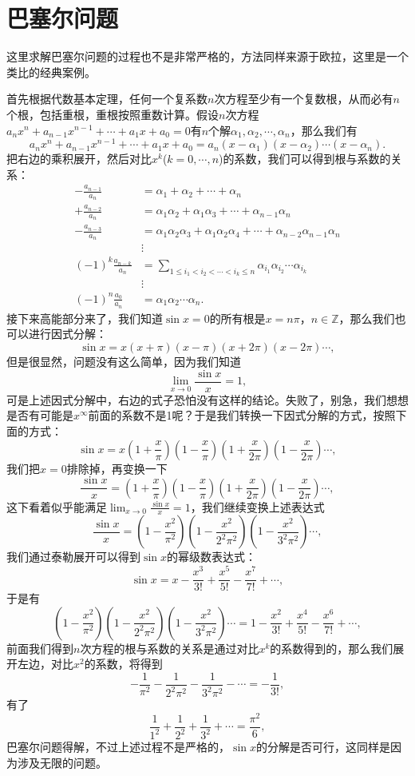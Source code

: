 \documentclass[cn]{elegantbook}
\begin{document}
\section{巴塞尔问题}
这里求解巴塞尔问题的过程也不是非常严格的，方法同样来源于欧拉，这里是一个类比的经典案例。

首先根据代数基本定理，任何一个复系数$n$次方程至少有一个复数根，从而必有$n$个根，包括重根，重根按照重数计算。假设$n$次方程$a_nx^n+a_{n-1}x^{n-1} + \cdots + a_1x+a_0=0$有$n$个解$\alpha_1, \alpha_2,\cdots,\alpha_n$，那么我们有
\[
a_nx^n+a_{n-1}x^{n-1} + \cdots + a_1x+a_0=a_n(x-\alpha_1)(x-\alpha_2)\cdots(x-\alpha_n).
\]
把右边的乘积展开，然后对比$x^k$($k=0,\cdots,n$)的系数，我们可以得到根与系数的关系：
\[
\begin{aligned}
-\frac{a_{n-1}}{a_n} &= \alpha_1+\alpha_2+\cdots+\alpha_n\\
+\frac{a_{n-2}}{a_n} &= \alpha_1\alpha_2 + \alpha_1\alpha_3+\cdots+\alpha_{n-1}\alpha_n \\
-\frac{a_{n-3}}{a_n} &= \alpha_1\alpha_2\alpha_3 + \alpha_1\alpha_2\alpha_4 + \cdots + \alpha_{n-2}\alpha_{n-1}\alpha_n \\
&\vdots\\
(-1)^k\frac{a_{n-k}}{a_n} &= \sum_{1\le i_1<i_2<\cdots<i_k \le n}{\alpha_{i_1}\alpha_{i_2}\cdots\alpha_{i_k}}\\
&\vdots\\
(-1)^n\frac{a_0}{a_n} &= \alpha_1\alpha_2\cdots\alpha_n.
\end{aligned}
\]
接下来高能部分来了，我们知道$\sin{x}=0$的所有根是$x=n\pi$，$n \in \mathbb{Z}$，那么我们也可以进行因式分解：
\[
\sin{x}=x(x+\pi)(x-\pi)(x+2\pi)(x-2\pi)\cdots,
\]
但是很显然，问题没有这么简单，因为我们知道
\[
\lim_{x \to 0}{\frac{\sin{x}}{x}}=1,
\]
可是上述因式分解中，右边的式子恐怕没有这样的结论。失败了，别急，我们想想是否有可能是$x^{\infty}$前面的系数不是1呢？于是我们转换一下因式分解的方式，按照下面的方式：
\[
\sin{x}=x(1+\frac{x}{\pi})(1-\frac{x}{\pi})(1+\frac{x}{2\pi})(1-\frac{x}{2\pi})\cdots,
\]
我们把$x=0$排除掉，再变换一下
\[
\frac{\sin{x}}{x}=(1+\frac{x}{\pi})(1-\frac{x}{\pi})(1+\frac{x}{2\pi})(1-\frac{x}{2\pi})\cdots,
\]
这下看着似乎能满足$\lim_{x \to 0}{\frac{\sin{x}}{x}}=1$，我们继续变换上述表达式
\[
\frac{\sin{x}}{x}=(1-\frac{x^2}{\pi^2})(1-\frac{x^2}{2^2\pi^2})(1-\frac{x^2}{3^2\pi^2})\cdots,
\]
我们通过泰勒展开可以得到$\sin{x}$的幂级数表达式：
\[
\sin{x} = x - \frac{x^3}{3!} + \frac{x^5}{5!} - \frac{x^7}{7!} + \cdots,
\]
于是有
\[
(1-\frac{x^2}{\pi^2})(1-\frac{x^2}{2^2\pi^2})(1-\frac{x^2}{3^2\pi^2})\cdots = 1 - \frac{x^2}{3!} + \frac{x^4}{5!} - \frac{x^6}{7!} + \cdots,
\]
前面我们得到$n$次方程的根与系数的关系是通过对比$x^k$的系数得到的，那么我们展开左边，对比$x^2$的系数，将得到
\[
-\frac{1}{\pi^2} - \frac{1}{2^2\pi^2} - \frac{1}{3^2\pi^2} - \cdots = -\frac{1}{3!},
\]
有了
\[
\frac{1}{1^2} + \frac{1}{2^2} + \frac{1}{3^2} + \cdots = \frac{\pi^2}{6},
\]
巴塞尔问题得解，不过上述过程不是严格的，$\sin{x}$的分解是否可行，这同样是因为涉及无限的问题。
\end{document}

